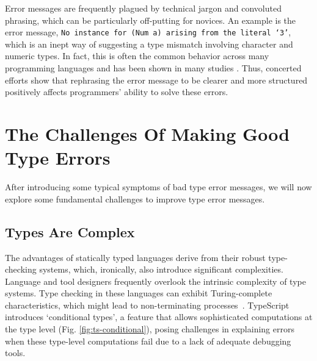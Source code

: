 Error messages are frequently plagued by technical jargon and convoluted phrasing, which can be particularly off-putting for novices. An example is the error message, \texttt{No instance for (Num a) arising from the literal `3'}, which is an inept way of suggesting a type mismatch involving character and numeric types. In fact, this is often the common behavior across many programming languages and has been shown in many studies \cite{Barik2017-gy, Tirronen2015-nr, Prather2017-dg}. Thus, concerted efforts \cite{Becker2016-kc, Barik2014-ib}  show that rephrasing the error message to be clearer and more structured positively affects programmers' ability to solve these errors.


\section{The Challenges Of Making Good Type Errors}
\label{sec:challenges}
After introducing some typical symptoms of bad type error messages, we will now explore some fundamental challenges to improve type error messages.

\subsection{Types Are Complex}

The advantages of statically typed languages derive from their robust type-checking systems, which, ironically, also introduce significant complexities. Language and tool designers frequently overlook the intrinsic complexity of type systems.  Type checking in these languages can exhibit Turing-complete characteristics, which might lead to non-terminating processes~\cite{Wells1999-ob}. TypeScript introduces `conditional types', a feature that allows sophisticated computations at the type level (Fig. \ref{fig:ts-conditional}), posing challenges in explaining errors when these type-level computations fail due to a lack of adequate debugging tools.



